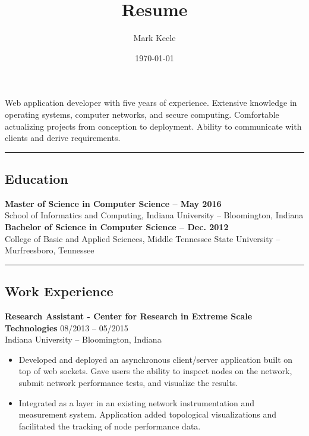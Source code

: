 \documentclass[12pt,letterpaper]{article}
\author{Mark Keele}
\title{Resume}
\date{\today}
\begin{document}
Web application developer with five years of experience. Extensive knowledge in operating systems, computer networks, and secure computing. Comfortable actualizing projects from conception to deployment. Ability to communicate with clients and derive requirements.

\noindent\rule{7.5in}{0.4pt}

\subsection*{Education}

\textbf{Master of Science in Computer Science -- May 2016} \\
\bigskip School of Informatics and Computing, Indiana University -- Bloomington, Indiana \\
\noindent\textbf{Bachelor of Science in Computer Science -- Dec. 2012} \\
College of Basic and Applied Sciences, Middle Tennessee State University -- Murfreesboro, Tennessee

\noindent\rule{7.5in}{0.4pt}

\subsection*{Work Experience}

\textbf{Research Assistant - Center for Research in Extreme Scale Technologies}
\hfill{08/2013 -- 05/2015} \\
Indiana University -- Bloomington, Indiana

\begin{itemize}


  \item Developed and deployed an asynchronous client/server application
  built on top of web sockets. Gave users the ability to inspect nodes
  on the network, submit network performance tests, and visualize the results.


  \item Integrated as a layer in an existing network instrumentation and
  measurement system. Application added topological visualizations and
  facilitated the tracking of node performance data.


\end{itemize}
\end{document}
